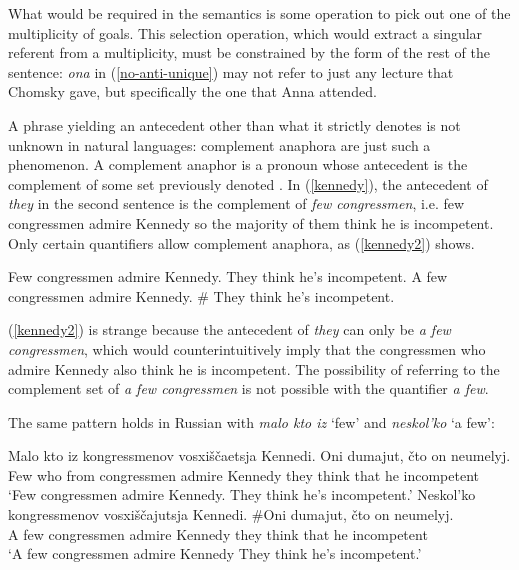 What would be required in the semantics is some operation to pick out one of the multiplicity of goals. This selection operation, which would extract a singular referent from a multiplicity, must be constrained by the form of the rest of the sentence: \textit{ona} in (\ref{no-anti-unique}) may not refer to just any lecture that Chomsky gave, but specifically the one that Anna attended.

A phrase yielding an antecedent other than what it strictly denotes is not unknown in natural languages: complement anaphora are just such a phenomenon. A complement anaphor is a pronoun whose antecedent is the complement of some set previously denoted \citep{nouwen03, schwarz09}. In (\ref{kennedy}), the antecedent of \textit{they} in the second sentence is the complement of \textit{few congressmen}, i.e. few congressmen admire Kennedy so the majority of them think he is incompetent. Only certain quantifiers allow complement anaphora, as (\ref{kennedy2}) shows.

\begin{exe}
	\ex \label{kennedy} Few congressmen admire Kennedy. They think he's incompetent.
	\ex \label{kennedy2} A few congressmen admire Kennedy. \# They think he's incompetent.
\end{exe}

(\ref{kennedy2}) is strange because the antecedent of \textit{they} can only be \textit{a few congressmen}, which would counterintuitively imply that the congressmen who admire Kennedy also think he is incompetent. The possibility of referring to the complement set of \textit{a few congressmen} is not possible with the quantifier \textit{a few}.

The same pattern holds in Russian with \textit{malo kto iz} `few' and \textit{neskol'ko} `a few':

\begin{exe}
	\ex \gll Malo kto iz kongressmenov vosxi\v{s}\v{c}aetsja Kennedi. Oni dumajut, \v{c}to on neumelyj.\\
	Few who from congressmen admire Kennedy they think that he incompetent\\
	\glt `Few congressmen admire Kennedy. They think he's incompetent.'
	\ex \gll Neskol'ko kongressmenov vosxi\v{s}\v{c}ajutsja Kennedi. \#Oni dumajut, \v{c}to on neumelyj.\\
	{A few} congressmen admire Kennedy they think that he incompetent\\
	\glt `A few congressmen admire Kennedy They think he's incompetent.'
\end{exe}

